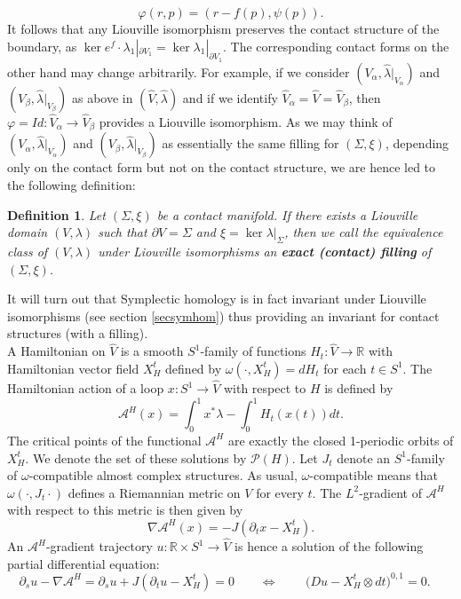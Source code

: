 \documentclass[a4paper,12pt,bibliography=totocnumbered,titlepage=false,abstracton,bookmarksnumbered=true]{scrartcl}
\newtheorem{defn}{Definition}
\theoremstyle{definition}
\begin{document}
\[\varphi(r,p)=(r-f(p),\psi(p)).\]
It follows that any Liouville isomorphism preserves the contact structure of the boundary, as $\ker e^f{\cdot}\lambda_1|_{\partial V_1}=\ker \lambda_1|_{\partial V_1}$. The corresponding contact forms on the other hand may change arbitrarily. For example, if we consider $(V_\alpha,\widehat{\lambda}|_{V_\alpha})$ and $(V_\beta,\widehat{\lambda}|_{V_\beta})$ as above in $(\widehat{V},\widehat{\lambda})$ and if we identify $\widehat{V}_\alpha=\widehat{V}=\widehat{V}_\beta$, then $\varphi=Id: \widehat{V}_\alpha\rightarrow\widehat{V}_\beta$ provides a Liouville isomorphism. As we may think of $(V_\alpha,\widehat{\lambda}|_{V_\alpha})$ and $(V_\beta,\widehat{\lambda}|_{V_\beta})$ as essentially the same filling for $(\Sigma,\xi)$, depending only on the contact form but not on the contact structure, we are hence led to the following definition:
\begin{defn}\label{filling}
 Let $(\Sigma,\xi)$ be a contact manifold. If there exists a Liouville domain $(V,\lambda)$ such that $\partial V=\Sigma$ and $\xi=\ker \lambda|_\Sigma$, then we call the equivalence class of $(V,\lambda)$ under Liouville isomorphisms an \textbf{\textit{exact (contact) filling}} of $(\Sigma,\xi)$.
\end{defn}
It will turn out that Symplectic homology is in fact invariant under Liouville isomorphisms (see section \ref{secsymhom}) thus providing an invariant for contact structures (with a filling).\bigskip\\
A Hamiltonian on $\widehat{V}$ is a smooth $S^1$-family of functions $H_t: \widehat{V}\rightarrow \mathbb{R}$ with Hamiltonian vector field $X_H^t$ defined by $\omega(\cdot,X^t_H)=dH_t$ for each $t\in S^1$. The Hamiltonian action of a loop $x: S^1\rightarrow \widehat{V}$ with respect to $H$ is defined by
\[\mathcal{A}^H(x)=\int^1_0 x^\ast\lambda - \int^1_0 H_t(x(t)) dt.\]
The critical points of the functional $\mathcal{A}^H$ are exactly the closed 1-periodic orbits of $X^t_H$. We denote the set of these solutions by $\mathcal{P}(H)$. Let $J_t$ denote an $S^1$-family of $\omega$-compatible almost complex structures. As usual, $\omega$-compatible means that $\omega(\cdot,J_t\cdot)$ defines a Riemannian metric on $V$ for every $t$. The $L^2$-gradient of $\mathcal{A}^H$ with respect to this metric is then given by
\[\nabla\mathcal{A}^H(x)=-J(\partial_t x-X_H^t).\]
An $\mathcal{A}^H$-gradient trajectory $u:\mathbb{R}\times S^1\rightarrow \widehat{V}$ is hence a solution of the following partial differential equation:
\begin{equation}\label{eqast}
 \partial_s u-\nabla\mathcal{A}^H=\partial_s u + J(\partial_t u-X_H^t)=0\qquad\Leftrightarrow \qquad\, \big(Du-X_H^t{\otimes} dt\big)^{0,1}=0.\quad
\end{equation}
\end{document}
